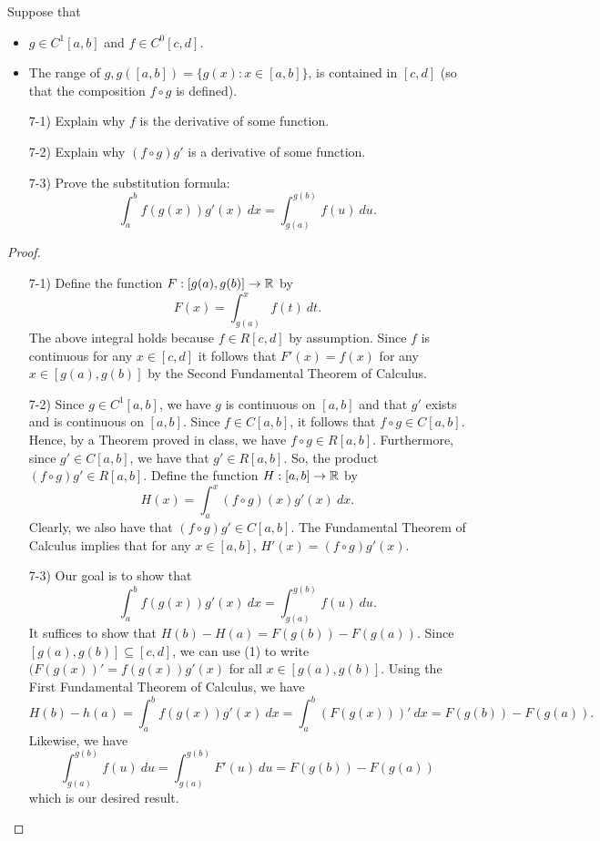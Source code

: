 \documentclass[a4paper]{article}
\begin{document}
\begin{problem}
   Suppose that  
   \begin{itemize}
       \item \( g \in C^{1}[a,b] \) and \( f \in C^{0}[c,d] \).
       \item The range of \( g , g([a,b]) = \{ g(x) : x \in [a,b] \}  \), is contained in \( [c,d] \) (so that the composition \( f \circ g  \) is defined).
   \end{itemize}
   \begin{enumerate}
       \item[7-1)] Explain why \( f  \) is the derivative of some function.
        \item[7-2)] Explain why \( (f \circ g ) g' \) is a derivative of some function.
        \item[7-3)] Prove the substitution formula:
            \[  \int_{ a }^{ b } f(g(x)) g'(x) \ dx = \int_{ g(a) }^{ g(b) }  f(u) \ du.  \]
   \end{enumerate}
\end{problem}
\begin{proof}
\begin{enumerate}
    \item[7-1)] Define the function \( F:[g(a),g(b)] \to \mathbb{R}  \) by
        \[  F(x) = \int_{ g(a) }^{ x }  f(t) \ dt. \]
        The above integral holds because \( f \in R[c,d] \) by assumption.
        Since \( f  \) is continuous for any \( x \in [c,d] \) it follows that \( F'(x) = f(x) \) for any \( x \in [g(a),g(b)] \) by the Second Fundamental Theorem of Calculus.
    \item[7-2)] Since \( g \in C^{1}[a,b] \), we have \( g  \) is continuous on \( [a,b] \) and that \( g' \) exists and is continuous on \( [a,b] \). Since \( f \in C[a,b] \), it follows that \( f \circ g \in C[a,b]  \). Hence, by a Theorem proved in class, we have \( f \circ g \in R[a,b] \). Furthermore, since \( g' \in C[a,b] \), we have that \( g' \in R[a,b] \). So, the product \( (f \circ g) g' \in R[a,b] \). Define the function \( H: [a,b] \to \mathbb{R}  \) by
        \[  H(x) = \int_{ a }^{ x }  (f \circ g)(x) g'(x) \ dx. \]
        Clearly, we also have that \( (f \circ g) g' \in C[a,b] \). The Fundamental Theorem of Calculus implies that for any \( x \in [a,b] \), \( H'(x) = (f \circ g)g'(x) \).
    \item[7-3)] Our goal is to show that 
        \[  \int_{ a }^{ b } f(g(x)) g'(x) \ dx = \int_{ g(a) }^{ g(b) } f(u) \ du.\]
        It suffices to show that \( H(b) - H(a) = F(g(b)) - F(g(a)) \).
        Since \( [g(a), g(b)] \subseteq  [c,d] \), we can use (1) to write \( (F(g(x))' = f(g(x)) g'(x)  \) for all \( x \in [g(a), g(b)] \). Using the First Fundamental Theorem of Calculus, we have
        \[  H(b) - h(a) = \int_{ a }^{ b } f(g(x)) g'(x) \ dx = \int_{ a }^{ b } (F(g(x)))' \ dx = F(g(b)) - F(g(a)).   \]
        Likewise, we have 
        \[  \int_{ g(a) }^{ g(b) } f(u) \ du = \int_{ g(a) }^{ g(b) } F'(u) \ du = F(g(b))  - F(g(a)) \]
        which is our desired result.
\end{enumerate}
\end{proof}
\end{document}
